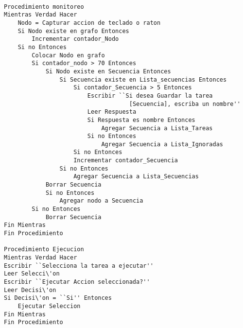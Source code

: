 \begin{table}[]

\begin{lstlisting}

Procedimiento monitoreo
Mientras Verdad Hacer
    Nodo = Capturar accion de teclado o raton
    Si Nodo existe en grafo Entonces
        Incrementar contador_Nodo
    Si no Entonces
        Colocar Nodo en grafo
        Si contador_nodo > 70 Entonces
            Si Nodo existe en Secuencia Entonces
                Si Secuencia existe en Lista_secuencias Entonces
                    Si contador_Secuencia > 5 Entonces
                        Escribir ``Si desea Guardar la tarea 
                                    [Secuencia], escriba un nombre''
                        Leer Respuesta
                        Si Respuesta es nombre Entonces
                            Agregar Secuencia a Lista_Tareas
                        Si no Entonces 
                            Agregar Secuencia a Lista_Ignoradas
                    Si no Entonces
                    Incrementar contador_Secuencia
                Si no Entonces
                    Agregar Secuencia a Lista_Secuencias
            Borrar Secuencia
            Si no Entonces
                Agregar nodo a Secuencia
		Si no Entonces
            Borrar Secuencia
Fin Mientras
Fin Procedimiento 

Procedimiento Ejecucion
Mientras Verdad Hacer
Escribir ``Selecciona la tarea a ejecutar''
Leer Selecci\'on
Escribir ``Ejecutar Accion seleccionada?''
Leer Decisi\'on
Si Decisi\'on = ``Si'' Entonces
	Ejecutar Seleccion
Fin Mientras
Fin Procedimiento

\end{lstlisting}

\end{table}
